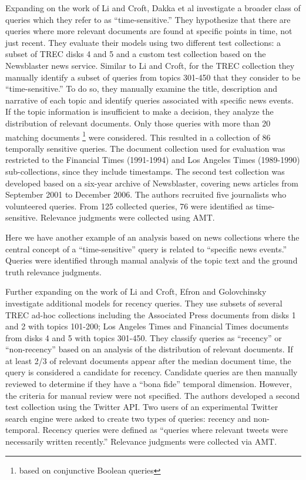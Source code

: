 \documentclass{sig-alternate}
\begin{document}
Expanding on the work of Li and Croft, Dakka et al \cite{Dakka2012} investigate a broader class of queries which they refer to as ``time-sensitive.'' They hypothesize that there are queries where more relevant documents are found at specific points in time, not just recent.  They evaluate their models using two different test collections: a subset of TREC disks 4 and 5 and a custom test collection based on the Newsblaster news service.  Similar to Li and Croft, for the TREC collection they manually identify a subset of queries from topics 301-450 that they consider to be ``time-sensitive.'' To do so, they manually examine the title, description and narrative of each topic and identify queries associated with specific news events. If the topic information is insufficient to make a decision, they analyze the distribution of relevant documents.  Only those queries with more than 20 matching documents \footnote{based on conjunctive Boolean queries} were considered.  This resulted in a collection of 86 temporally sensitive queries. The document collection used for evaluation was restricted to the Financial Times (1991-1994) and Los Angeles Times (1989-1990) sub-collections, since they include timestamps. The second test collection was developed based on a six-year archive of Newsblaster, covering news articles from September 2001 to December 2006. The authors recruited five journalists who volunteered queries.  From 125 collected queries, 76 were identified as time-sensitive. Relevance judgments were collected using AMT.

Here we have another example of an analysis based on news collections where the central concept of a ``time-sensitive'' query is related to ``specific news events.'' Queries were identified through manual analysis of the topic text and the ground truth relevance judgments.

Further expanding on the work of Li and Croft, Efron and Golovchinsky \cite{Efron2011} investigate additional models for recency queries.  They use subsets of several TREC ad-hoc collections including the Associated Press documents from disks 1 and 2 with topics 101-200; Los Angeles Times and Financial Times documents from disks 4 and 5 with topics 301-450.  They classify queries as ``recency'' or ``non-recency'' based on an analysis of the distribution of relevant documents. If at least 2/3 of relevant documents appear after the median document time, the query is considered a candidate for recency.  Candidate queries are then manually reviewed to determine if they have a ``bona fide'' temporal dimension. However, the criteria for manual review were not specified.   The authors developed a second test collection using the Twitter API.  Two users of an experimental Twitter search engine were asked to create two types of queries: recency and non-temporal. Recency queries were defined as ``queries where relevant tweets were necessarily written recently.''  Relevance judgments were collected via AMT.  
\end{document}
